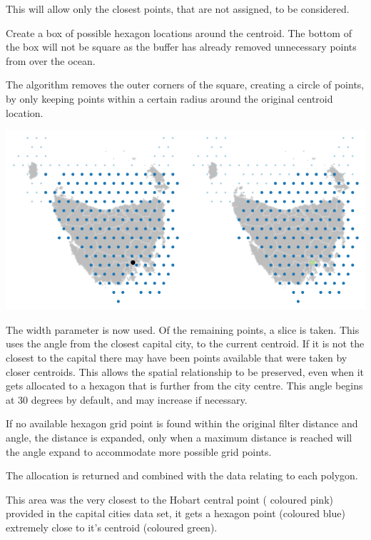 This will allow only the closest points, that are not assigned, to be
considered.

Create a box of possible hexagon locations around the centroid. The
bottom of the box will not be square as the buffer has already removed
unnecessary points from over the ocean.

The algorithm removes the outer corners of the square, creating a circle
of points, by only keeping points within a certain radius around the
original centroid location.

\begin{Schunk}

\includegraphics{algorithmRjournal_files/figure-latex/buffers-1} \end{Schunk}

The width parameter is now used. Of the remaining points, a slice is
taken. This uses the angle from the closest capital city, to the current
centroid. If it is not the closest to the capital there may have been
points available that were taken by closer centroids. This allows the
spatial relationship to be preserved, even when it gets allocated to a
hexagon that is further from the city centre. This angle begins at 30
degrees by default, and may increase if necessary.

If no available hexagon grid point is found within the original filter
distance and angle, the distance is expanded, only when a maximum
distance is reached will the angle expand to accommodate more possible
grid points.

The allocation is returned and combined with the data relating to each
polygon.

This area was the very closest to the Hobart central point ( coloured
pink) provided in the capital cities data set, it gets a hexagon point
(coloured blue) extremely close to it's centroid (coloured green).


